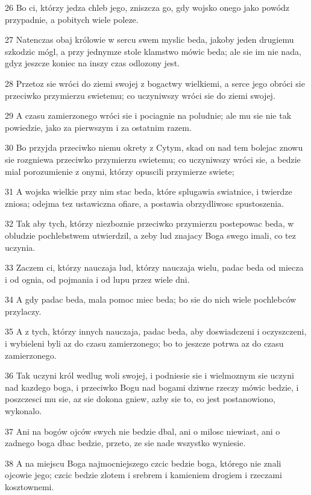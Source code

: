 \par 26 Bo ci, którzy jedza chleb jego, zniszcza go, gdy wojsko onego jako powódz przypadnie, a pobitych wiele poleze.
\par 27 Natenczas obaj królowie w sercu swem myslic beda, jakoby jeden drugiemu szkodzic mógl, a przy jednymze stole klamstwo mówic beda; ale sie im nie nada, gdyz jeszcze koniec na inszy czas odlozony jest.
\par 28 Przetoz sie wróci do ziemi swojej z bogactwy wielkiemi, a serce jego obróci sie przeciwko przymierzu swietemu; co uczyniwszy wróci sie do ziemi swojej.
\par 29 A czasu zamierzonego wróci sie i pociagnie na poludnie; ale mu sie nie tak powiedzie, jako za pierwszym i za ostatnim razem.
\par 30 Bo przyjda przeciwko niemu okrety z Cytym, skad on nad tem bolejac znowu sie rozgniewa przeciwko przymierzu swietemu; co uczyniwszy wróci sie, a bedzie mial porozumienie z onymi, którzy opuscili przymierze swiete;
\par 31 A wojska wielkie przy nim stac beda, które splugawia swiatnice, i twierdze zniosa; odejma tez ustawiczna ofiare, a postawia obrzydliwosc spustoszenia.
\par 32 Tak aby tych, którzy niezboznie przeciwko przymierzu postepowac beda, w obludzie pochlebstwem utwierdzil, a zeby lud znajacy Boga swego imali, co tez uczynia.
\par 33 Zaczem ci, którzy nauczaja lud, którzy nauczaja wielu, padac beda od miecza i od ognia, od pojmania i od lupu przez wiele dni.
\par 34 A gdy padac beda, mala pomoc miec beda; bo sie do nich wiele pochlebców przylaczy.
\par 35 A z tych, którzy innych nauczaja, padac beda, aby doswiadczeni i oczyszczeni, i wybieleni byli az do czasu zamierzonego; bo to jeszcze potrwa az do czasu zamierzonego.
\par 36 Tak uczyni król wedlug woli swojej, i podniesie sie i wielmoznym sie uczyni nad kazdego boga, i przeciwko Bogu nad bogami dziwne rzeczy mówic bedzie, i poszczesci mu sie, az sie dokona gniew, azby sie to, co jest postanowiono, wykonalo.
\par 37 Ani na bogów ojców swych nie bedzie dbal, ani o milosc niewiast, ani o zadnego boga dbac bedzie, przeto, ze sie nade wszystko wyniesie.
\par 38 A na miejscu Boga najmocniejszego czcic bedzie boga, którego nie znali ojcowie jego; czcic bedzie zlotem i srebrem i kamieniem drogiem i rzeczami kosztownemi.
